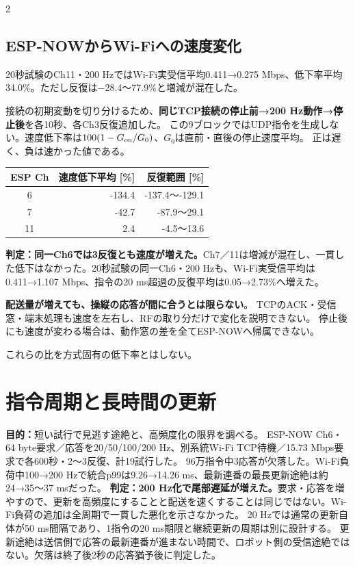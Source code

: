 \documentclass[a4paper,twocolumn,10pt]{ltjsarticle}
\begin{document}
\begin{multicols}{2}
\columnbreak
\subsection{ESP-NOWからWi-Fiへの速度変化}
20秒試験のCh11・200 HzではWi-Fi実受信平均0.411→0.275 Mbps、低下率平均34.0\%。ただし反復は−28.4〜77.9\%と増減が混在した。

接続の初期変動を切り分けるため、\textbf{同じTCP接続の停止前→200 Hz動作→停止後}を各10秒、各Ch3反復追加した。
この9ブロックではUDP指令を生成しない。速度低下率は$100(1-G_{\rm on}/G_0)$、$G_0$は直前・直後の停止速度平均。
正は遅く、負は速かった値である。
\begin{center}
\small\begin{tabular}{@{}crr@{}}\toprule ESP Ch & 速度低下平均 [\%] & 反復範囲 [\%]\\\midrule
6 & -134.4 & -137.4〜-129.1\\
7 & -42.7 & -87.9〜29.1\\
11 & 2.4 & -4.5〜13.6\\
\bottomrule\end{tabular}\end{center}
\textbf{判定：同一Ch6では3反復とも速度が増えた。}Ch7／11は増減が混在し、一貫した低下はなかった。20秒試験の同一Ch6・200 Hzも、Wi-Fi実受信平均は0.411→1.107 Mbps、指令の20 ms超過の反復平均は0.05→2.73\%へ増えた。

\textbf{配送量が増えても、操縦の応答が間に合うとは限らない}。
TCPのACK・受信窓・端末処理も速度を左右し、RFの取り分だけで変化を説明できない。
停止後にも速度が変わる場合は、動作窓の差を全てESP-NOWへ帰属できない。

これらの比を方式固有の低下率とはしない。

\section{指令周期と長時間の更新}
\textbf{目的：}短い試行で見逃す途絶と、高頻度化の限界を調べる。
ESP-NOW Ch6・64 byte要求／応答を20/50/100/200 Hz、別系統Wi-Fi TCP待機／15.73 Mbps要求で各600秒・2〜3反復、計19試行した。
96万指令中3応答が欠落した。Wi-Fi負荷中100→200 Hzで統合p99は9.26→14.26 ms、最新連番の最長更新途絶は約24→35〜37 msだった。
\textbf{判定：200 Hz化で尾部遅延が増えた。}要求・応答を増やすので、更新を高頻度にすることと配送を速くすることは同じではない。Wi-Fi負荷の追加は全周期で一貫した悪化を示さなかった。
20 Hzでは通常の更新自体が50 ms間隔であり、1指令の20 ms期限と継続更新の周期は別に設計する。
更新途絶は送信側で応答の最新連番が進まない時間で、ロボット側の受信途絶ではない。欠落は終了後2秒の応答猶予後に判定した。
\end{multicols}\clearpage
\end{document}
